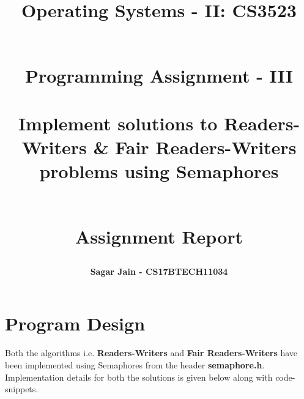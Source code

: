 \documentclass[a4paper,12pt]{report}
\begin{document}
\title{
\textbf{Operating Systems - II: CS3523}\\~\\
\begin{large}
\textbf{Programming Assignment - III\\~\\Implement solutions to Readers-Writers \& Fair
Readers-Writers problems using Semaphores\\~\\}
\end{large}
\begin{large}
\textbf{Assignment Report}
\end{large}
}
\author{\textbf{Sagar Jain - CS17BTECH11034}\\}
\maketitle
\begin{large}
\tableofcontents
\end{large}
\newpage
\section{Program Design}
Both the algorithms i.e. \textbf{Readers-Writers} and \textbf{Fair Readers-Writers} have been implemented using Semaphores from the header \textbf{semaphore.h}. Implementation details for both the solutions is given below along with code-snippets.
\end{document}
